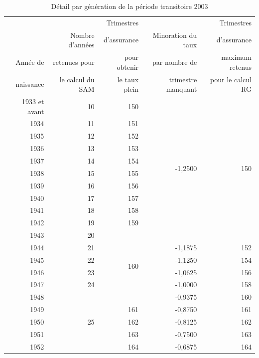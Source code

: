 \begin{table}[h]
  \centering
  \caption{Détail par génération de la période transitoire 2003}
    \begin{tabular}{rrrrr}
    \toprule
              &                   & Trimestres    &                       & Trimestres \\
              & Nombre d'années   & d'assurance   & Minoration du taux    & d'assurance   \\
    Année de  & retenues pour     & pour obtenir  & par nombre de         & maximum retenus        \\
    naissance & le calcul du SAM  & le taux plein & trimestre manquant    & pour le calcul RG      \\
    \midrule
    1933 et avant & 10    & 150   & \multicolumn{1}{r}{\multirow{11}[0]{*}{-1,2500}} & \multicolumn{1}{r}{\multirow{11}[0]{*}{150}} \\
    1934  & 11    & 151   & \multicolumn{1}{c}{} & \multicolumn{1}{c}{} \\
    1935  & 12    & 152   & \multicolumn{1}{c}{} & \multicolumn{1}{c}{} \\
    1936  & 13    & 153   & \multicolumn{1}{c}{} & \multicolumn{1}{c}{} \\
    1937  & 14    & 154   & \multicolumn{1}{c}{} & \multicolumn{1}{c}{} \\
    1938  & 15    & 155   & \multicolumn{1}{c}{} & \multicolumn{1}{c}{} \\
    1939  & 16    & 156   & \multicolumn{1}{c}{} & \multicolumn{1}{c}{} \\
    1940  & 17    & 157   & \multicolumn{1}{c}{} & \multicolumn{1}{c}{} \\
    1941  & 18    & 158   & \multicolumn{1}{c}{} & \multicolumn{1}{c}{} \\
    1942  & 19    & 159   & \multicolumn{1}{c}{} & \multicolumn{1}{c}{} \\
    1943  & 20    & \multicolumn{1}{r}{\multirow{6}[0]{*}{160}} & \multicolumn{1}{r}{} & \multicolumn{1}{c}{} \\
    1944  & 21    & \multicolumn{1}{c}{} & -1,1875 & 152 \\
    1945  & 22    & \multicolumn{1}{c}{} & -1,1250 & 154 \\
    1946  & 23    & \multicolumn{1}{c}{} & -1,0625 & 156 \\
    1947  & 24    & \multicolumn{1}{c}{} & -1,0000 & 158 \\
    1948  & \multicolumn{1}{r}{\multirow{5}[0]{*}{25}} & \multicolumn{1}{r}{} & -0,9375 & 160 \\
    1949  & \multicolumn{1}{c}{} & 161   & -0,8750 & 161 \\
    1950  & \multicolumn{1}{c}{} & 162   & -0,8125 & 162 \\
    1951  & \multicolumn{1}{c}{} & 163   & -0,7500 & 163 \\
    1952  & \multicolumn{1}{c}{} & 164   & -0,6875 & 164 \\
    \bottomrule
    \end{tabular}%
  \label{tab:addlabel}%
\end{table}%

